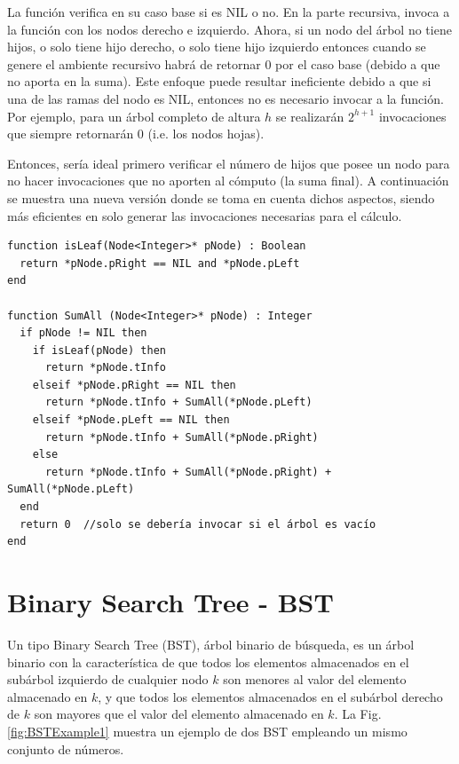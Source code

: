 La función verifica en su caso base si es NIL o no. En la parte recursiva, invoca a la función con los nodos derecho e izquierdo. Ahora, si un nodo del árbol no tiene hijos, o solo tiene hijo derecho, o solo tiene hijo izquierdo entonces cuando se genere el ambiente recursivo habrá de retornar 0 por el caso base (debido a que no aporta en la suma). Este enfoque puede resultar ineficiente debido a que si una de las ramas del nodo es NIL, entonces no es necesario invocar a la función. Por ejemplo, para un árbol completo de altura $h$ se realizarán $2^{h+1}$ invocaciones que siempre retornarán 0 (i.e. los nodos hojas).

Entonces, sería ideal primero verificar el número de hijos que posee un nodo para no hacer invocaciones que no aporten al cómputo (la suma final). A continuación se muestra una nueva versión donde se toma en cuenta dichos aspectos, siendo más eficientes en solo generar las invocaciones necesarias para el cálculo.

\begin{lstlisting}[upquote=true, language=pseudo]
function isLeaf(Node<Integer>* pNode) : Boolean
  return *pNode.pRight == NIL and *pNode.pLeft
end

function SumAll (Node<Integer>* pNode) : Integer
  if pNode != NIL then
    if isLeaf(pNode) then
      return *pNode.tInfo
    elseif *pNode.pRight == NIL then
      return *pNode.tInfo + SumAll(*pNode.pLeft)
    elseif *pNode.pLeft == NIL then
      return *pNode.tInfo + SumAll(*pNode.pRight)
    else
      return *pNode.tInfo + SumAll(*pNode.pRight) + SumAll(*pNode.pLeft)
  end
  return 0	//solo se debería invocar si el árbol es vacío
end
\end{lstlisting}

\section{Binary Search Tree - BST}

Un tipo Binary Search Tree (BST), árbol binario de búsqueda, es un árbol binario con la característica de que todos los elementos almacenados en el subárbol izquierdo de cualquier nodo $k$ son menores al valor del elemento almacenado en $k$, y que todos los elementos almacenados en el subárbol derecho de $k$ son mayores que el valor del elemento almacenado en $k$. La Fig. \ref{fig:BSTExample1} muestra un ejemplo de dos BST empleando un mismo conjunto de números.

